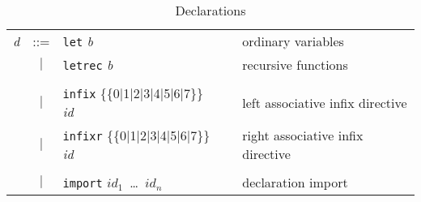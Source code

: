 \documentclass[11pt]{article}
\begin{document}
\begin{table}[h]
\centering\narrowlines\normalsize
\begin{tabular}{|rcp{50mm}p{5mm}p{52mm}|}
\hline
{\it d} &::= & {\tt let} {\it b}     & &  ordinary variables \\
  & $|$  & {\tt letrec}  {\it b}     & &  recursive functions \\[-0.8em]
  &      &                           & & \\
  & $|$  & {\tt infix} \{\{0$\mid$1$\mid$2$\mid$3$\mid$4$\mid$5$\mid$6$\mid$7\}\}   {\it id}
                                     & &  left associative infix directive \\
  & $|$  & {\tt infixr} \{\{0$\mid$1$\mid$2$\mid$3$\mid$4$\mid$5$\mid$6$\mid$7\}\}  {\it id}
                                     & &  right associative infix directive \\[-0.8em]
  &      &                           & & \\
  & $|$  & {\tt import}  $id_1$\ \ldots\ $id_n$
                                     & &  declaration import \\
\hline
\end{tabular}


\caption{Declarations}
\label{tab:ml-declarations}
\end{table}
\end{document}
